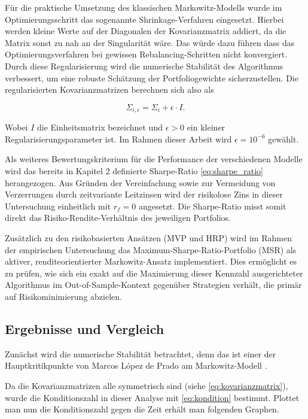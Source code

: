 \documentclass[parskip=half]{scrartcl}
\begin{document}
	Für die praktische Umsetzung des klassischen Markowitz-Modells wurde im Optimierungsschritt das sogenannte Shrinkage-Verfahren eingesetzt. Hierbei werden kleine Werte auf der Diagonalen der Kovarianzmatrix addiert, da die Matrix sonst zu nah an der Singularität wäre. Das würde dazu führen dass das Optimierungsverfahren bei gewissen Rebalancing-Schritten nicht konvergiert. Durch diese Regularisierung wird die numerische Stabilität des Algorithmus verbessert, um eine robuste Schätzung der Portfoliogewichte sicherzustellen.
	Die regularisierten Kovarianzmatrizen berechnen sich also als
	
	\begin{equation}
		\Sigma_{i, \epsilon} = \Sigma_i + \epsilon \cdot I . \label{eq:shrinkage}
	\end{equation}
	
	Wobei $I$ die Einheitsmatrix bezeichnet und $\epsilon > 0$ ein kleiner Regularisierungsparameter ist. Im Rahmen dieser Arbeit wird $\epsilon = 10^{-6}$ gewählt.
	
	Als weiteres Bewertungskriterium für die Performance der verschiedenen Modelle wird das bereits in Kapitel 2 definierte Sharpe-Ratio \eqref{eq:sharpe_ratio} herangezogen. Aus Gründen der Vereinfachung sowie zur Vermeidung von Verzerrungen durch zeitvariante Leitzinsen wird der risikolose Zins in dieser Untersuchung einheitlich mit $r_f = 0$ angesetzt. Die Sharpe-Ratio misst somit direkt das Risiko-Rendite-Verhältnis des jeweiligen Portfolios.
	
	Zusätzlich zu den risikobasierten Ansätzen (MVP und HRP) wird im Rahmen der empirischen Untersuchung das Maximum-Sharpe-Ratio-Portfolio (MSR) als aktiver, renditeorientierter Markowitz-Ansatz implementiert. Dies ermöglicht es zu prüfen, wie sich ein exakt auf die Maximierung dieser Kennzahl ausgerichteter Algorithmus im Out-of-Sample-Kontext gegenüber Strategien verhält, die primär auf Risikominimierung abzielen.
	
	
	\subsection{Ergebnisse und Vergleich}
	
	Zunächst wird die numerische Stabilität betrachtet, denn das ist einer der Hauptkritikpunkte von Marcos López de Prado am Markowitz-Modell \parencite[222]{Lopez}.
	
	Da die Kovarianzmatrizen alle symmetrisch sind (siehe \eqref{eq:kovarianzmatrix}), wurde die Konditionszahl in dieser Analyse mit \eqref{eq:kondition} bestimmt. Plottet man nun die Konditionszahl gegen die Zeit erhält man folgenden Graphen.
	
\end{document}
